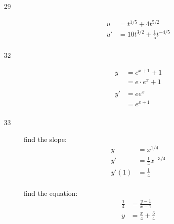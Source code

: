 \documentclass[letterpaper, landscape]{exam}
\begin{document}
\begin{description}
    \item[29] 
      \begin{align*}
        u  & = t^{1/5} + 4t^{5/2} \\
        u' & = \boxed{ 10 t^{3/2} + \frac{1}{5} t^{-4/5}  } \\
      \end{align*}



    \item[32] 
      \begin{align*}
        y  & = e^{x + 1} + 1 \\
           & = e \cdot e^x + 1 \\
        \\
        y' & = e e^x \\
           & = \boxed{ e^{x + 1} } \\
      \end{align*}

    \item[33] 
      find the slope: 
      \begin{align*}
        y     & = x^{1/4} \\
        y'    & = \frac{1}{4} x^{-3/4} \\
        y'(1) & = \frac{1}{4} \\
      \end{align*}

      find the equation:
      \begin{align*}
        \frac{1}{4} & = \frac{y - 1}{x - 1} \\
        y           & = \boxed{ \frac{x}{4} + \frac{3}{4} } \\
      \end{align*}


\end{description}
\end{document}
